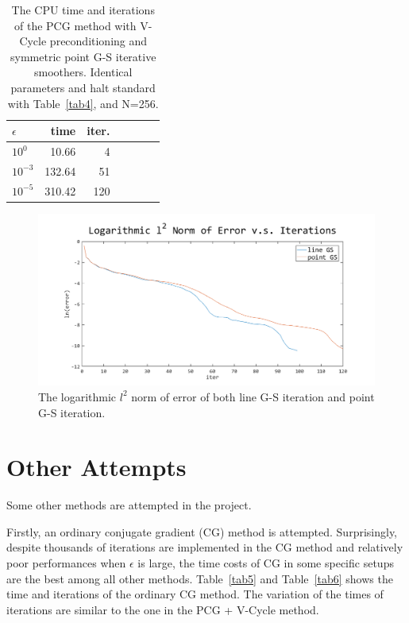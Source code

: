 \documentclass{article}
\begin{document}
\begin{table}[t]
\caption{The CPU time and iterations of the PCG method with V-Cycle preconditioning and symmetric point G-S iterative smoothers. Identical parameters and halt standard with Table~\ref{tab4}, and N=256. }
\label{tab3}
\vskip 0.15in
\begin{center}
\begin{small}
\begin{sc}
\begin{tabular}{lrrrrrr}
\toprule
$\epsilon$ & time & iter. \\
\midrule
$10^{0}$ & 10.66 & 4 \\
$10^{-3}$ & 132.64 & 51 \\
$10^{-5}$ & 310.42 & 120 \\
\bottomrule
\end{tabular}
\end{sc}
\end{small}
\end{center}
\vskip -0.1in
\end{table}

\begin{figure}[ht]
\vskip 0.2in
\begin{center}
\centerline{\includegraphics[width=\columnwidth]{error}}
\caption{The logarithmic $l^2$ norm of error of both line G-S iteration and point G-S iteration.}
\label{fig1}
\end{center}
\vskip -0.2in
\end{figure}

\section{Other Attempts}

Some other methods are attempted in the project.

Firstly, an ordinary conjugate gradient (CG) method is attempted. Surprisingly, despite thousands of iterations are implemented in the CG method and relatively poor performances when $\epsilon$ is large, the time costs of CG in some specific setups are the best among all other methods. Table~\ref{tab5} and Table~\ref{tab6} shows the time and iterations of the ordinary CG method. The variation of the times of iterations are similar to the one in the PCG + V-Cycle method.
\end{document}
